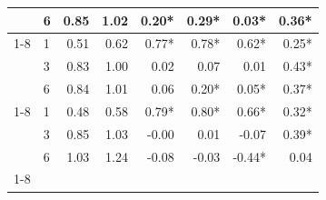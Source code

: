 \begin{table}
\begin{tabular}{llrrrrrr}
 & 6 & 0.85 & 1.02 & 0.20* & 0.29* & 0.03* & 0.36* \\
\cline{1-8}
\multirow[t]{3}{*}{rf} & 1 & 0.51 & 0.62 & 0.77* & 0.78* & 0.62* & 0.25* \\
 & 3 & 0.83 & 1.00 & 0.02 & 0.07 & 0.01 & 0.43* \\
 & 6 & 0.84 & 1.01 & 0.06 & 0.20* & 0.05* & 0.37* \\
\cline{1-8}
\multirow[t]{3}{*}{xgboost} & 1 & 0.48 & 0.58 & 0.79* & 0.80* & 0.66* & 0.32* \\
 & 3 & 0.85 & 1.03 & -0.00 & 0.01 & -0.07 & 0.39* \\
 & 6 & 1.03 & 1.24 & -0.08 & -0.03 & -0.44* & 0.04 \\
\cline{1-8}
\bottomrule
\end{tabular}
\end{table}
